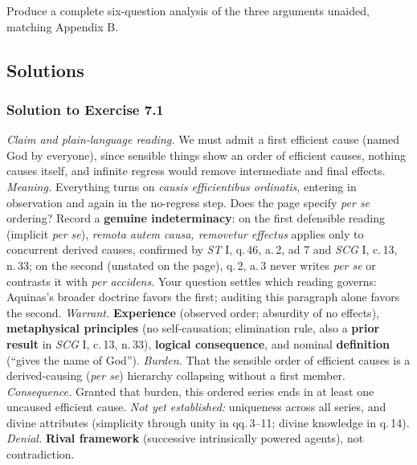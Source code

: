 Produce a complete six-question analysis of the three arguments unaided, matching Appendix B.

\subsection{Solutions}

\subsubsection*{Solution to Exercise 7.1}
\emph{Claim and plain-language reading.} We must admit a first efficient cause (named God by everyone), since sensible things show an order of efficient causes, nothing causes itself, and infinite regress would remove intermediate and final effects. \emph{Meaning.} Everything turns on \emph{causis efficientibus ordinatis}, entering in observation and again in the no-regress step. Does the page specify \emph{per se} ordering? Record a \textbf{genuine indeterminacy}: on the first defensible reading (implicit \emph{per se}), \emph{remota autem causa, removetur effectus} applies only to concurrent derived causes, confirmed by \emph{ST} I, q.\,46, a.\,2, ad 7 and \emph{SCG} I, c.\,13, n.\,33; on the second (unstated on the page), q.\,2, a.\,3 never writes \emph{per se} or contrasts it with \emph{per accidens}. Your question settles which reading governs: Aquinas's broader doctrine favors the first; auditing this paragraph alone favors the second. \emph{Warrant.} \textbf{Experience} (observed order; absurdity of no effects), \textbf{metaphysical principles} (no self-causation; elimination rule, also a \textbf{prior result} in \emph{SCG} I, c.\,13, n.\,33), \textbf{logical consequence}, and nominal \textbf{definition} (``gives the name of God''). \emph{Burden.} That the sensible order of efficient causes is a derived-causing (\emph{per se}) hierarchy collapsing without a first member. \emph{Consequence.} Granted that burden, this ordered series ends in at least one uncaused efficient cause. \emph{Not yet established:} uniqueness across all series, and divine attributes (simplicity through unity in qq.\,3--11; divine knowledge in q.\,14). \emph{Denial.} \textbf{Rival framework} (successive intrinsically powered agents), not contradiction.

